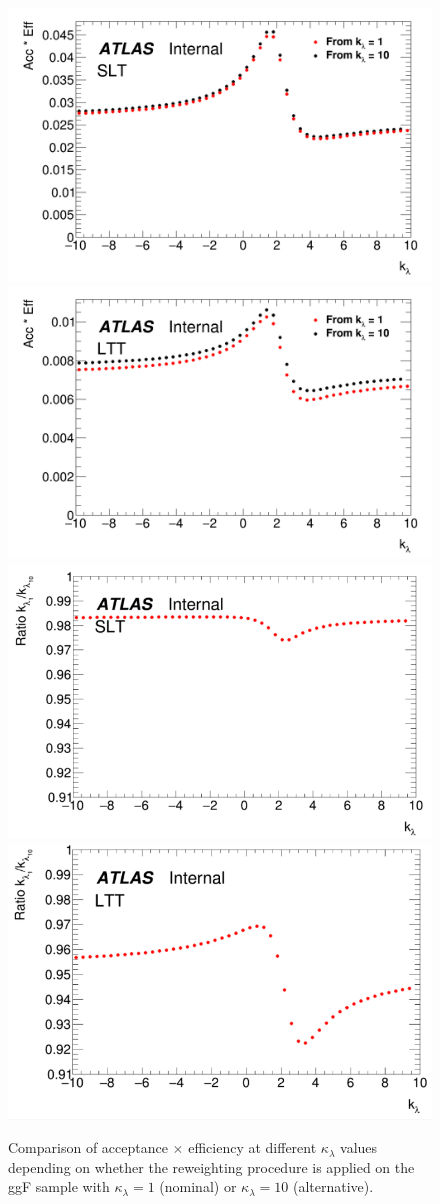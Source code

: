 \begin{figure}[htbp]
    \begin{center}
        \includegraphics[width=.45\textwidth]{DiHiggs/plots/kl_SLT acc.png}
        \includegraphics[width=.45\textwidth]{DiHiggs/plots/kl_LTT acc.png} \\
        \includegraphics[width=.45\textwidth]{DiHiggs/plots/kl_scan/bbtautauSubchannels/bbtautau_kl_accxeff_slt.png}
        \includegraphics[width=.45\textwidth]{DiHiggs/plots/kl_scan/bbtautauSubchannels/bbtautau_kl_accxeff_ltt.png}
    \end{center}
    \caption{Comparison of acceptance $\times$ efficiency at different $\kappa_\lambda$ values depending on whether the 
    reweighting procedure is applied on the ggF sample with $\kappa_\lambda = 1$ (nominal) 
    or $\kappa_\lambda = 10$ (alternative).}
    \label{fig:bbtautau_accxeff}
\end{figure}

